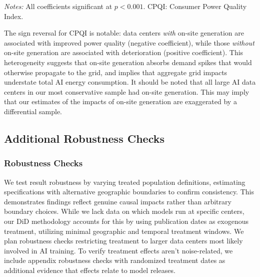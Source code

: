 \documentclass[sigconf]{acmart}
\newcommand{\nb}[1]{\textcolor{blue}{NB[#1]}}
\begin{document}
\begin{table}[h]
\centering
\caption{Power Quality Effects by On-site Generation Status}
\label{tab:btm_effects}
\begin{flushleft}
\footnotesize\textit{Notes:} All coefficients significant at $p < 0.001$. CPQI: Consumer Power Quality Index.
\end{flushleft}
\end{table}

The sign reversal for CPQI is notable: data centers \textit{with} on-site generation are associated with improved power quality (negative coefficient), while those \textit{without} on-site generation are associated with deterioration (positive coefficient). This heterogeneity suggests that on-site generation absorbs demand spikes that would otherwise propagate to the grid, and implies that aggregate grid impacts understate total AI energy consumption. It should be noted that all large AI data centers in our most conservative sample had on-site generation. This may imply that our estimates of the impacts of on-site generation are exaggerated by a differential sample.



\subsection{Additional Robustness Checks}\label{App:AdditionalRobustnessChecks}


\subsubsection{Robustness Checks}
We test result robustness by varying treated population definitions, estimating specifications with alternative geographic boundaries to confirm consistency. This demonstrates findings reflect genuine causal impacts rather than arbitrary boundary choices. While we lack data on which models run at specific centers, our DiD methodology accounts for this by using publication dates as exogenous treatment, utilizing minimal geographic and temporal treatment windows. We plan robustness checks restricting treatment to larger data centers most likely involved in AI training. To verify treatment effects aren't noise-related, we include appendix robustness checks with randomized treatment dates as additional evidence that effects relate to model releases.
\end{document}

